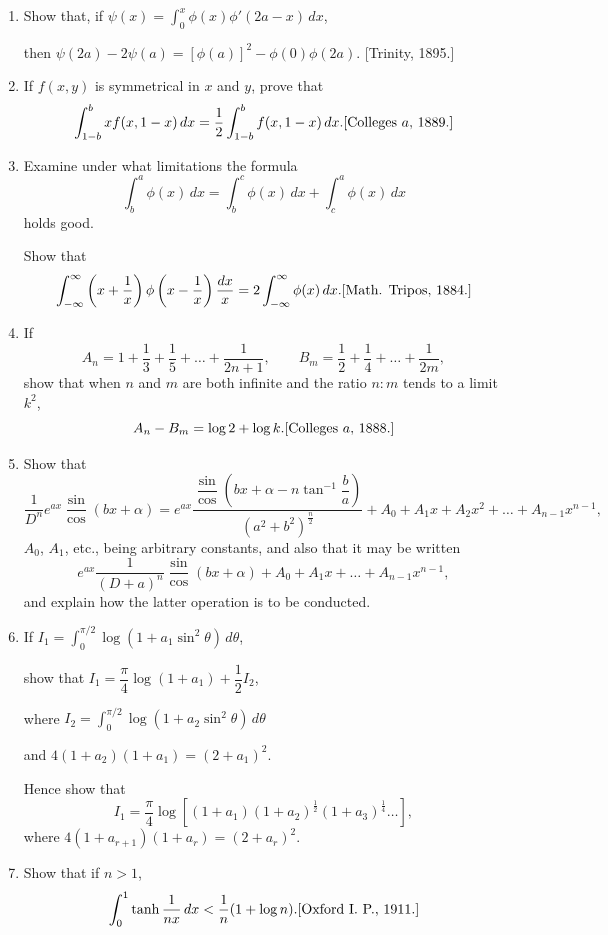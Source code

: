 \documentclass[11pt, a4paper]{article}
\newcommand{\source}[1]{\hfill\textnormal{[#1]}}
\begin{document}
\begin{enumerate}[leftmargin=2em]
\item Show that, if $\displaystyle\psi(x)=\int_0^x \phi(x)\phi'(2a-x)\,dx$,

then $\psi(2a)-2\psi(a)=[\phi(a)]^2-\phi(0)\phi(2a)$. \source{Trinity, 1895.}

\item If $f(x,y)$ is symmetrical in $x$ and $y$, prove that
\[
\int_{1-b}^{b} xf(x,1-x)\,dx=\dfrac12\int_{1-b}^{b} f(x,1-x)\,dx. \source{Colleges $a$, 1889.}
\]

\item Examine under what limitations the formula
\[
\int_b^a \phi(x)\,dx=\int_b^c \phi(x)\,dx+\int_c^a \phi(x)\,dx
\]
holds good.

Show that
\[
\int_{-\infty}^{\infty}\left(x+\dfrac1x\right)\phi\left(x-\dfrac1x\right)\dfrac{dx}{x}=2\int_{-\infty}^{\infty}\phi(x)\,dx. \source{Math. Tripos, 1884.}
\]

\item If
\[
A_n=1+\dfrac13+\dfrac15+\dots+\dfrac{1}{2n+1}, \qquad B_m=\dfrac12+\dfrac14+\dots+\dfrac{1}{2m},
\]
show that when $n$ and $m$ are both infinite and the ratio $n:m$ tends to a limit $k^2$,
\[
A_n-B_m=\log2+\log k. \source{Colleges $a$, 1888.}
\]

\item Show that
\[
\dfrac{1}{D^n}e^{ax}\dfrac{\sin}{\cos}(bx+\alpha)=e^{ax}\dfrac{\dfrac{\sin}{\cos}\left(bx+\alpha-n\tan^{-1}\dfrac{b}{a}\right)}{(a^2+b^2)^{\frac{n}{2}}}
+A_0+A_1x+A_2x^2+\dots+A_{n-1}x^{n-1},
\]
$A_0$, $A_1$, etc., being arbitrary constants, and also that it may be written
\[
e^{ax}\dfrac{1}{(D+a)^n}\dfrac{\sin}{\cos}(bx+\alpha)+A_0+A_1x+\dots+A_{n-1}x^{n-1},
\]
and explain how the latter operation is to be conducted.

\item If $\displaystyle I_1=\int_0^{\pi/2}\log(1+a_1\sin^2\theta)\,d\theta$,

show that $I_1=\dfrac{\pi}{4}\log(1+a_1)+\dfrac12I_2$,

where $\displaystyle I_2=\int_0^{\pi/2}\log(1+a_2\sin^2\theta)\,d\theta$

and $4(1+a_2)(1+a_1)=(2+a_1)^2$.

Hence show that
\[
I_1=\dfrac{\pi}{4}\log\left[(1+a_1)(1+a_2)^{\frac12}(1+a_3)^{\frac14}\dots\right],
\]
where $4(1+a_{r+1})(1+a_r)=(2+a_r)^2$.

\item Show that if $n>1$,
\[
\int_0^1 \tanh\dfrac{1}{nx}\,dx<\dfrac1n(1+\log n). \source{Oxford I. P., 1911.}
\]


\end{enumerate}
\end{document}
